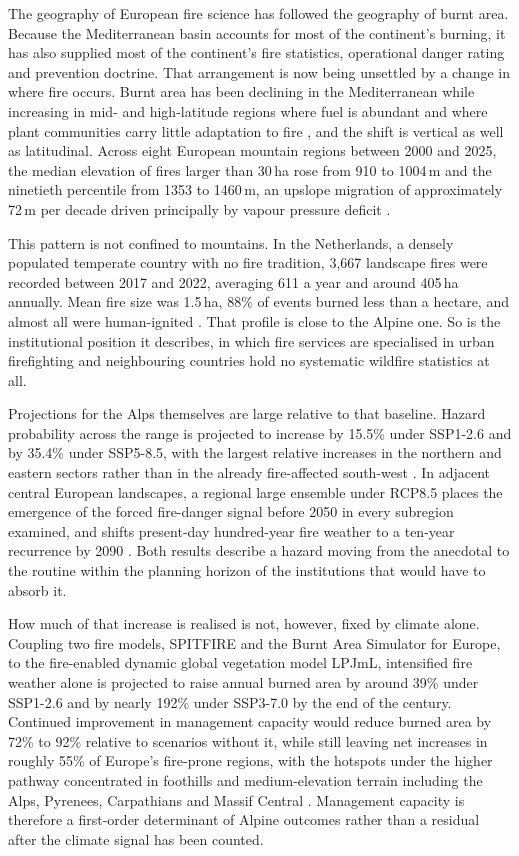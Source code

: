 \documentclass[11pt,a4paper]{article}
\begin{document}
The geography of European fire science has followed the geography of burnt area. Because the Mediterranean basin accounts for most of the continent's burning, it has also supplied most of the continent's fire statistics, operational danger rating and prevention doctrine. That arrangement is now being unsettled by a change in where fire occurs. Burnt area has been declining in the Mediterranean while increasing in mid- and high-latitude regions where fuel is abundant and where plant communities carry little adaptation to fire \citep{miller_compounding_2025}, and the shift is vertical as well as latitudinal. Across eight European mountain regions between 2000 and 2025, the median elevation of fires larger than 30\,ha rose from 910 to 1004\,m and the ninetieth percentile from 1353 to 1460\,m, an upslope migration of approximately 72\,m per decade driven principally by vapour pressure deficit \citep{beloiu_climatedriven_2026}.

This pattern is not confined to mountains. In the Netherlands, a densely populated temperate country with no fire tradition, 3{,}667 landscape fires were recorded between 2017 and 2022, averaging 611 a year and around 405\,ha annually. Mean fire size was 1.5\,ha, 88\% of events burned less than a hectare, and almost all were human-ignited \citep{stoof_temperate_2024}. That profile is close to the Alpine one. So is the institutional position it describes, in which fire services are specialised in urban firefighting and neighbouring countries hold no systematic wildfire statistics at all.

Projections for the Alps themselves are large relative to that baseline. Hazard probability across the range is projected to increase by 15.5\% under SSP1-2.6 and by 35.4\% under SSP5-8.5, with the largest relative increases in the northern and eastern sectors rather than in the already fire-affected south-west \citep{gerberding_mapping_2025}. In adjacent central European landscapes, a regional large ensemble under RCP8.5 places the emergence of the forced fire-danger signal before 2050 in every subregion examined, and shifts present-day hundred-year fire weather to a ten-year recurrence by 2090 \citep{miller_climate_2024}. Both results describe a hazard moving from the anecdotal to the routine within the planning horizon of the institutions that would have to absorb it.

How much of that increase is realised is not, however, fixed by climate alone. Coupling two fire models, SPITFIRE and the Burnt Area Simulator for Europe, to the fire-enabled dynamic global vegetation model LPJmL, intensified fire weather alone is projected to raise annual burned area by around 39\% under SSP1-2.6 and by nearly 192\% under SSP3-7.0 by the end of the century. Continued improvement in management capacity would reduce burned area by 72\% to 92\% relative to scenarios without it, while still leaving net increases in roughly 55\% of Europe's fire-prone regions, with the hotspots under the higher pathway concentrated in foothills and medium-elevation terrain including the Alps, Pyrenees, Carpathians and Massif Central \citep{billing_future_2026}. Management capacity is therefore a first-order determinant of Alpine outcomes rather than a residual after the climate signal has been counted.
\end{document}
